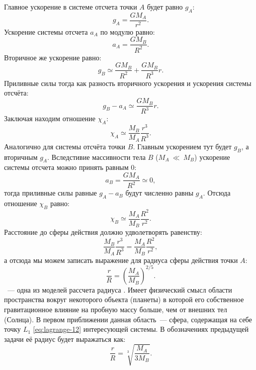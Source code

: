Главное ускорение в системе отсчета точки $A$ будет равно $g_A$:
\begin{equation*}
    g_A = \frac{GM_A}{r^2}.
\end{equation*}
Ускорение системы отсчета $a_A$ по модулю равно:
\begin{equation*}
    a_A = \frac{GM_B}{R^2}.
\end{equation*}
Вторичное же ускорение равно:
\begin{equation*}
    g_B\simeq\frac{GM_B}{R^2}+\frac{GM_B}{R^3}r.
\end{equation*}
Приливные силы тогда как разность вторичного ускорения и ускорения системы отсчёта:
\begin{equation*}
    g_B-a_A \simeq \frac{G M_B}{R^3} r.
\end{equation*} 
Заключая находим отношение $\chi_A$:
\begin{equation*}
    \chi_A\simeq\frac{M_B}{M_A} \frac{r^3}{R^3}.
\end{equation*}
Аналогично для системы отсчёта точки $B$. Главным ускорением тут будет $g_B$, а вторичным $g_A$. Вследстивие массивности тела $B$ ($M_A~\ll~M_B$) ускорение системы отсчета можно принять равным 0:
\begin{equation*}
    a_B=\frac{G M_A}{R^2} \simeq 0,
\end{equation*}
тогда приливные силы равные $g_A-a_B$ будут численно равны $g_A$. Отсюда отношение $\chi_B$ равно:
\begin{equation*}
    \chi_B \simeq \frac{M_A}{M_B} \frac{R^2}{r^2}.
\end{equation*}
Расстояние до сферы действия должно удволетворять равенству:
\begin{equation*}
    \frac{M_B}{M_A} \frac{r^3}{R^3}=\frac{M_A}{M_B} \frac{R^2}{r^2},
\end{equation*}
а отсюда мы можем записать выражение для радиуса сферы действия точки $A$:
\begin{equation}
    \frac{r}{R}=\left(\frac{M_A}{M_B}\right)^{2 / 5}.
\end{equation} 
~--- одна из моделей рассчета радиуса . Имеет физический смысл области пространства вокруг некоторого объекта (планеты) в которой его собственное гравитационное влияние на пробную массу больше, чем от внешних тел (Солнца). В первом приближении данная область~--- сфера, содержащая на себе точку $L_1$ \eqref{eq:lagrange-12} интересующей системы. В обозначениях предыдущей задачи её радиус будет выражаться как:
\begin{equation}
    \frac{r}{R} = \sqrt[3]{\frac{M_A}{3M_B}}.
\end{equation}
